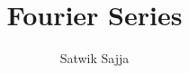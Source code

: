 \documentclass[journal,12pt,twocolumn]{IEEEtran}
\begin{document}
\let\StandardTheFigure\thefigure
\renewcommand{\thefigure}{\theproblem}



\def\putbox#1#2#3{\makebox[0in][l]{\makebox[#1][l]{}\raisebox{\baselineskip}[0in][0in]{\raisebox{#2}[0in][0in]{#3}}}}
     \def\rightbox#1{\makebox[0in][r]{#1}}
     \def\centbox#1{\makebox[0in]{#1}}
     \def\topbox#1{\raisebox{-\baselineskip}[0in][0in]{#1}}
     \def\midbox#1{\raisebox{-0.5\baselineskip}[0in][0in]{#1}}

\vspace{3cm}

\title{ 
Fourier Series
}


%
%
%

\author{ Satwik Sajja } %

% 
%
\end{document}
